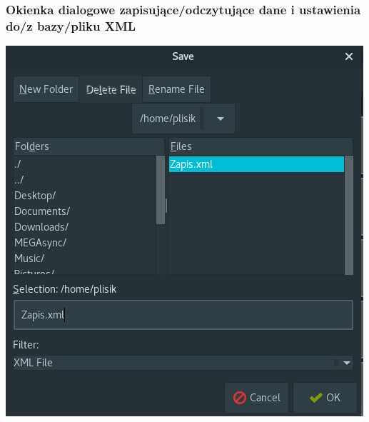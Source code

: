 \documentclass[a4paper,12pt]{article}
\begin{document}
\subsubsection{Okienka dialogowe zapisujące/odczytujące dane i ustawienia do/z bazy/pliku XML}
\begin{minipage}{0.5\textwidth}

    \includegraphics[width=\textwidth]{./screen/AppScreen/SaveTo.png}
    \label{MainViewLinux}

\end{minipage}
\end{document}
